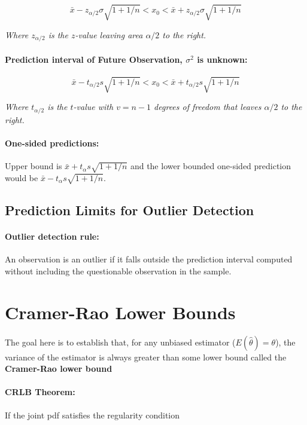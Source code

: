 \documentclass[a4paper,12pt]{report}
\begin{document}
$$\bar{x} - z_{\alpha/2}\sigma \sqrt{1 + 1/n} < x_0 < \bar{x} + z_{\alpha/2}\sigma\sqrt{1+1/n}$$

\textit{Where $z_{\alpha/2}$ is the $z$-value leaving area $\alpha/2$ to the right.} 

\paragraph{Prediction interval of Future Observation, $\sigma^2$ is unknown: } 

$$\bar{x} - t_{\alpha/2} s \sqrt{1 + 1/n} < x_0 < \bar{x} + t_{\alpha/2} s \sqrt{1+1/n}$$

\textit{Where $t_{\alpha/2}$ is the $t$-value with $v = n-1$ degrees of freedom that leaves $\alpha/2$ to the right.}


\paragraph{One-sided predictions: } Upper bound is $\bar{x} + t_\alpha s \sqrt{1+1/n}$ and the lower bounded one-sided prediction would be $\bar{x} - t_\alpha s \sqrt{1+1/n}$. 


\subsection{Prediction Limits for Outlier Detection}

\paragraph{Outlier detection rule: } An observation is an outlier if it falls outside the prediction interval computed without including the questionable observation in the sample.

\section{Cramer-Rao Lower Bounds}

The goal here is to establish that, for any unbiased estimator ($E(\hat{\theta}) = \theta$), the variance of the estimator is always greater than some lower bound called the \textbf{Cramer-Rao lower bound} 

\paragraph{CRLB Theorem: } If the joint pdf satisfies the regularity condition 
\end{document}
